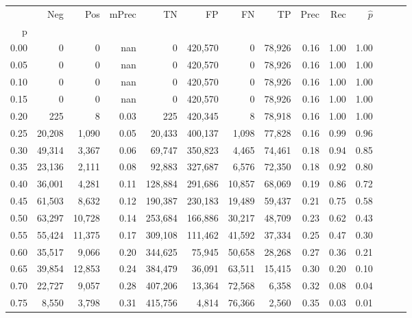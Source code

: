 \begin{tabular}{rrrrrrrrrrrrrr}
\toprule
{} &     Neg &     Pos & mPrec &       TN &       FP &      FN &      TP &  Prec &   Rec & $\hat{p}$ \\
p    &         &         &       &          &          &         &         &       &       &           \\
\midrule
0.00 &       0 &       0 &   nan &        0 &  420,570 &       0 &  78,926 &  0.16 &  1.00 &      1.00 \\
0.05 &       0 &       0 &   nan &        0 &  420,570 &       0 &  78,926 &  0.16 &  1.00 &      1.00 \\
0.10 &       0 &       0 &   nan &        0 &  420,570 &       0 &  78,926 &  0.16 &  1.00 &      1.00 \\
0.15 &       0 &       0 &   nan &        0 &  420,570 &       0 &  78,926 &  0.16 &  1.00 &      1.00 \\
0.20 &     225 &       8 &  0.03 &      225 &  420,345 &       8 &  78,918 &  0.16 &  1.00 &      1.00 \\
0.25 &  20,208 &   1,090 &  0.05 &   20,433 &  400,137 &   1,098 &  77,828 &  0.16 &  0.99 &      0.96 \\
0.30 &  49,314 &   3,367 &  0.06 &   69,747 &  350,823 &   4,465 &  74,461 &  0.18 &  0.94 &      0.85 \\
0.35 &  23,136 &   2,111 &  0.08 &   92,883 &  327,687 &   6,576 &  72,350 &  0.18 &  0.92 &      0.80 \\
0.40 &  36,001 &   4,281 &  0.11 &  128,884 &  291,686 &  10,857 &  68,069 &  0.19 &  0.86 &      0.72 \\
0.45 &  61,503 &   8,632 &  0.12 &  190,387 &  230,183 &  19,489 &  59,437 &  0.21 &  0.75 &      0.58 \\
0.50 &  63,297 &  10,728 &  0.14 &  253,684 &  166,886 &  30,217 &  48,709 &  0.23 &  0.62 &      0.43 \\
0.55 &  55,424 &  11,375 &  0.17 &  309,108 &  111,462 &  41,592 &  37,334 &  0.25 &  0.47 &      0.30 \\
0.60 &  35,517 &   9,066 &  0.20 &  344,625 &   75,945 &  50,658 &  28,268 &  0.27 &  0.36 &      0.21 \\
0.65 &  39,854 &  12,853 &  0.24 &  384,479 &   36,091 &  63,511 &  15,415 &  0.30 &  0.20 &      0.10 \\
0.70 &  22,727 &   9,057 &  0.28 &  407,206 &   13,364 &  72,568 &   6,358 &  0.32 &  0.08 &      0.04 \\
0.75 &   8,550 &   3,798 &  0.31 &  415,756 &    4,814 &  76,366 &   2,560 &  0.35 &  0.03 &      0.01 \\

\end{tabular}
